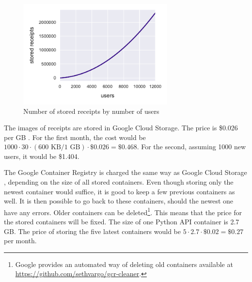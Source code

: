 \documentclass[
  digital, %
  table,   %
  oneside, %
  lof,     %
  lot,     %
]{fithesis3}
\begin{document}
\begin{figure}
    \begin{center}
        \includegraphics[width=0.7\textwidth]{figures/graphs/receipts_by_users}
    \end{center}
    \caption{Number of stored receipts by number of users}
    \label{fig:receipts_by_users}
\end{figure}

The images of receipts are stored in Google Cloud Storage. The price is \$0.026 per GB \cite{CloudStoragePricing}. For the first month, the cost would be $\num{1000}\cdot30\cdot(600\text{ KB} / 1\text{ GB})\cdot\$0.026 = \$0.468$.
For the second, assuming \num{1000} new users, it would be \$1.404.

The Google Container Registry is charged the same way as Google Cloud Storage \cite{ContainerRegistryPricing}, depending on the size of all stored containers. Even though storing only the newest container would suffice, it is good to keep a few previous containers as well. It is then possible to go back to these containers, should the newest one have any errors. Older containers can be deleted\footnote{Google provides an automated way of deleting old containers available at \url{https://github.com/sethvargo/gcr-cleaner}.}. This means that the price for the stored containers will be fixed. The size of one Python API container is 2.7 GB. The price of storing the five latest containers would be $5\cdot2.7\cdot\$0.02 = \$0.27$ per month. 
\end{document}
